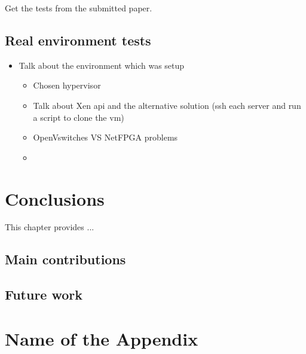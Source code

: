 \documentclass[12pt,english]{book}
\begin{document}
Get the tests from the submitted paper.
\newpage

\section{Real environment tests}
\begin{itemize}
	\item Talk about the environment which was setup
	\begin{itemize}
		\item Chosen hypervisor
		\item Talk about Xen api and the alternative solution (ssh each server and run a script to clone the vm)
		\item OpenVswitches VS NetFPGA problems
		\item 
	\end{itemize}
\end{itemize}
\newpage

\chapter{Conclusions\label{cha:conclusions}}

This chapter provides ...

\section{Main contributions}

\section{Future work}

\appendix

\chapter{Name of the Appendix}

\cleardoublepage


\cleardoublepage



\nocite{*}
\end{document}
